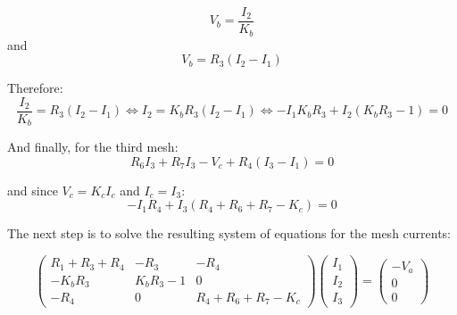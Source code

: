 \[   V_b = \frac{I_2}{K_b}   \]
and
\[   V_b = R_3(I_2-I_1)   \]

Therefore:
\begin{equation}
\frac{I_2}{K_b} = R_3(I_2 - I_1)\Leftrightarrow I_2 = K_bR_3(I_2-I_1)\Leftrightarrow -I_1K_bR_3 + I_2(K_bR_3-1) = 0
  \label{eq:kvl}
\end{equation}

And finally, for the third mesh:
\begin{equation}
  R_6I_3 + R_7I_3 - V_c + R_4(I_3-I_1) = 0
  \label{eq:kvl}
\end{equation}

and since $V_c = K_cI_c$ and $I_c=I_3$:
\begin{equation}
 -I_1R_4 + I_3 (R_4+R_6+R_7-K_c) = 0
  \label{eq:kvl}
\end{equation}

The next step is to solve the resulting system of equations for the mesh currents:

\begin{equation}
\left(\begin{array}{ccc} R_1+R_3+R_4 & -R_3 & -R_4\\ -K_bR_3 & K_bR_3-1 & 0 \\ -R_4 & 0 & R_4+R_6+R_7-K_c \end{array}\right)
\left(\begin{array}{c} I_1 \\ I_2 \\ I_3 \end{array}\right) 
= \left(\begin{array}{c} -V_a \\ 0 \\ 0 \end{array}\right)
\end{equation}

